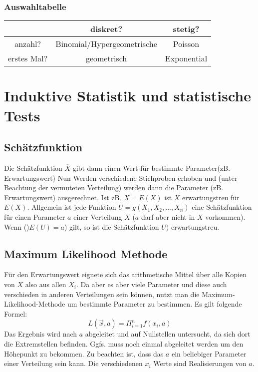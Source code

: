 \documentclass[a4paper]{scrartcl}
\begin{document}
                \subsubsection*{Auswahltabelle}
                \begin{tabular}{|c|c|c|}
                    \hline
                    \; & diskret? & stetig? \\
                    \hline
                    anzahl? & Binomial/Hypergeometrische & Poisson \\
                    \hline
                    erstes Mal? & geometrisch & Exponential \\
                    \hline     
                \end{tabular}
    \section{Induktive Statistik und statistische Tests}
        \subsection{Schätzfunktion}
            Die Schätzfunktion \(\overline{X}\) gibt dann einen Wert für bestimmte Parameter(zB. Erwartungswert) Nun Werden verschiedene Stichproben erhoben
            und (unter Beachtung der vermuteten Verteilung) werden dann die Parameter (zB. Erwartungswert) ausgerechnet. Ist zB. \(\overline{X} = E(X)\) ist \(\overline{X}\)
            erwartungstreu für \(E(X)\). Allgemein ist jede Funktion \(U = g(X_1,X_2,...,X_n)\) eine Schätzfunktion für einen Parameter \(a\) einer Verteilung \(X\) (\(a\) darf aber nicht in \(X\) 
            vorkommen). \\
            Wenn ()\(E(U) = a\)) gilt, so ist die Schätzfunktion \(U)\) erwartungstreu.
        \subsection{Maximum Likelihood Methode}
            Für den Erwartungswert eignete sich das arithmetische Mittel über alle Kopien von \(X\) also aus allen \(X_i\).
            Da aber es aber viele Parameter und diese auch verschieden in anderen Verteilungen sein können, nutzt man die Maximum-Likelihood-Methode um bestimmte Parameter zu bestimmen.   
            Es gilt folgende Formel: 
            \begin{equation*}
                L (\vec{x},a) = \Pi_{i=1}^n f(x_i,a)
            \end{equation*}
            Das Ergebnis wird nach \(a\) abgeleitet und auf Nullstellen untersucht, da sich dort die Extremstellen befinden. Ggfs. muss noch einmal abgeleitet werden um den Höhepunkt 
            zu bekommen. Zu beachten ist, dass das \(a\) ein beliebiger Parameter einer Verteilung sein kann. Die verschiedenen \(x_i\) Werte sind Realisierungen von \(a\).
\end{document}

